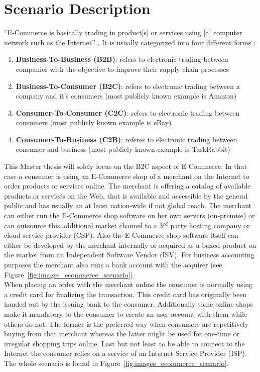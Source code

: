 
\section{Scenario Description}
\label{sec:scenario_description}

``E-Commerce is basically trading in product[s] or services using [a] computer network such as the Internet'' \citep{sen2015study}.
It is usually categorized into four different forms \citep{sen2015study}:\@

\begin{enumerate}
  \item \textbf{Business-To-Business (B2B)}: refers to electronic trading between companies with the objective to improve their supply chain processes
  \item \textbf{Business-To-Consumer (B2C)}: refers to electronic trading between a company and it's consumers (most publicly known example is Amazon)
  \item \textbf{Consumer-To-Consumer (C2C)}: refers to electronic trading between consumers (most publicly known example is eBay)
  \item \textbf{Consumer-To-Business (C2B)}: referes to electronic trading between consumer and business (most publicly known example is TaskRabbit)
\end{enumerate}

This Master thesis will solely focus on the B2C aspect of E-Commerce. In that case a consumer is using an E-Commerce shop of a merchant on the Internet to order products or services online. The merchant is offering a catalog of available products or services on the Web, that is available and accessible by the general public and has usually an at least nation-wide if not global reach. The merchant can either run the E-Commerce shop software on her own servers (on-premise) or can outsource this additional market channel to a 3$^{rd}$ party hosting company or cloud service provider (CSP). Also the E-Commerce shop software itself can either be developed by the merchant internally or acquired as a boxed product on the market from an Independent Software Vendor (ISV). For business accounting purposes the merchant also runs a bank account with the acquirer (see Figure~\ref{fig:images_ecommerce_scenario}). \\
When placing an order with the merchant online the consumer is normally using a credit card for finalizing the transaction. This credit card has originally been handed out by the issuing bank to the consumer. Additionally some online shops make it mandatory to the consumer to create an user account with them while others do not. The former is the preferred way when consumers are repetitively buying from that merchant whereas the latter might be used for one-time or irregular shopping trips online. Last but not least to be able to connect to the Internet the consumer relies on a service of an Internet Service Provider (ISP). The whole scenario is found in Figure~\ref{fig:images_ecommerce_scenario}.\@

